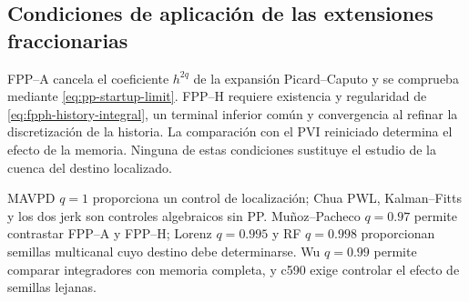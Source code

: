 \subsection{Condiciones de aplicación de las extensiones fraccionarias}

\begin{proposalbox}
FPP--A cancela el coeficiente \(h^{2q}\) de la expansión Picard--Caputo y
se comprueba mediante \cref{eq:pp-startup-limit}. FPP--H requiere existencia
y regularidad de \cref{eq:fpph-history-integral}, un terminal inferior común
y convergencia al refinar la discretización de la historia. La comparación
con el PVI reiniciado determina el efecto de la memoria. Ninguna de estas
condiciones sustituye el estudio de la cuenca del destino localizado.
\end{proposalbox}

MAVPD \(q=1\) proporciona un control de localización;
Chua PWL, Kalman--Fitts y los dos jerk son controles algebraicos sin PP. Muñoz--Pacheco
\(q=0.97\) permite contrastar FPP--A y FPP--H; Lorenz
\(q=0.995\) y RF \(q=0.998\) proporcionan semillas multicanal cuyo destino
debe determinarse. Wu \(q=0.99\) permite comparar integradores con memoria
completa, y c590 exige controlar el efecto de semillas lejanas.
